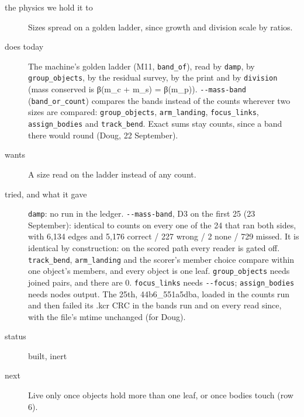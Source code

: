 \begin{description}
\item[{the physics we hold it to}] Sizes spread on a golden ladder, since growth and division scale by ratios.
\item[{does today}] The machine's golden ladder (M11, \texttt{band\_\allowbreak{}of}), read by \texttt{damp}, by \texttt{group\_\allowbreak{}objects}, by the residual survey, by the print and by \texttt{division} (mass conserved is β(m\_\allowbreak{}c + m\_\allowbreak{}s) = β(m\_\allowbreak{}p)). \texttt{-\allowbreak{}-\allowbreak{}mass-\allowbreak{}band} (\texttt{band\_\allowbreak{}or\_\allowbreak{}count}) compares the bands instead of the counts wherever two sizes are compared: \texttt{group\_\allowbreak{}objects}, \texttt{arm\_\allowbreak{}landing}, \texttt{focus\_\allowbreak{}links}, \texttt{assign\_\allowbreak{}bodies} and \texttt{track\_\allowbreak{}bend}. Exact sums stay counts, since a band there would round (Doug, 22 September).
\item[{wants}] A size read on the ladder instead of any count.
\item[{tried, and what it gave}] \texttt{damp}: no run in the ledger. \texttt{-\allowbreak{}-\allowbreak{}mass-\allowbreak{}band}, D3 on the first 25 (23 September): identical to counts on every one of the 24 that ran both sides, with 6,134 edges and 5,176 correct / 227 wrong / 2 none / 729 missed. It is identical by construction: on the scored path every reader is gated off. \texttt{track\_\allowbreak{}bend}, \texttt{arm\_\allowbreak{}landing} and the scorer's member choice compare within one object's members, and every object is one leaf. \texttt{group\_\allowbreak{}objects} needs joined pairs, and there are 0. \texttt{focus\_\allowbreak{}links} needs \texttt{-\allowbreak{}-\allowbreak{}focus}; \texttt{assign\_\allowbreak{}bodies} needs nodes output. The 25th, 44b6\_\allowbreak{}551a5dba, loaded in the counts run and then failed its .kcr CRC in the bands run and on every read since, with the file's mtime unchanged (for Doug).
\item[{status}] built, inert
\item[{next}] Live only once objects hold more than one leaf, or once bodies touch (row 6).
\end{description}

